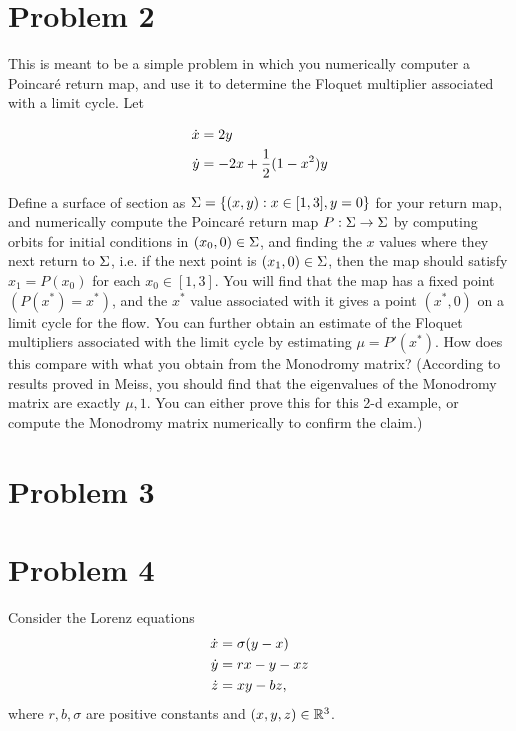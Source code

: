 \newpage
\section{Problem 2}
This is meant to be a simple problem in which you numerically computer a Poincar\'e return map, and use it to determine the Floquet multiplier associated with a limit cycle. Let

\begin{align}
    \dot{x} &= 2y\nonumber\\
    \dot{y} &= -2x + \frac{1}{2}(1 - x^2)y\nonumber
\end{align}

Define a surface of section as $\Sigma = \{(x, y) : x \in [1, 3], y = 0\}$ for your return map, and numerically compute the Poincar\'e return map $P: \Sigma \rightarrow \Sigma $ by computing orbits for initial conditions in $(x_0, 0) \in \Sigma$, and finding the $x$ values where they next return to $\Sigma$, i.e. if the next point is $(x_1, 0) \in \Sigma$, then the map should satisfy $x_1 = P(x_0)$ for each $x_0 \in [1, 3]$. You will find that the map has a fixed point $(P(x^*) = x^*)$, and the $x^*$ value associated with it gives a point $(x^*, 0)$ on a limit cycle for the flow. You can further obtain an estimate of the Floquet multipliers associated with the limit cycle by estimating $\mu = P'(x^*)$. How does this compare with what you obtain from the Monodromy matrix? (According to results proved in Meiss, you should find that the eigenvalues of the Monodromy matrix are exactly $\mu, 1$. You can either prove this for this 2-d example, or compute the Monodromy matrix numerically to confirm the claim.)


\newpage
\section{Problem 3}


\newpage
\section{Problem 4}
Consider the Lorenz equations
\begin{align}
    \dot{x} &= \sigma(y - x) \nonumber\\
    \dot{y} &= rx - y - xz \nonumber\\
    \dot{z} &= xy - bz, \nonumber    
\end{align}
where $r, b, \sigma$ are positive constants and $(x, y, z)\in \mathbb{R}^3$.

